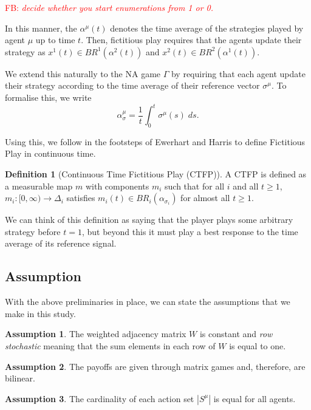 \documentclass{article}
\theoremstyle{definition}
\newtheorem*{definition}{Definition}
\newtheorem{assumption}{Assumption}
\newcommand{\fb}[1]{\textcolor{red}{FB: \textit{#1}}}
\newcommand{\weightset}{W}
\newcommand{\actionset}[1]{S^{#1}}
\newcommand{\refmu}{\sigma^{\mu}}
\newcommand{\avgref}[1]{\alpha_\sigma^{#1}}
\begin{document}
        \fb{decide whether you start enumerations from 1 or 0.}


	In this manner, the $\alpha^\mu(t)$ denotes the time average of the strategies played by agent
	$\mu$ up to time $t$. Then, fictitious play requires that the agents update their strategy as
	$x^1(t) \in BR^1(\alpha^2(t))$ and $x^2(t) \in
	BR^2(\alpha^1(t))$. 

	We extend this naturally to the NA game $\Gamma$ by requiring that each agent update their
	strategy according to the time average of their reference vector $\refmu$. To formalise this, we
	write
	\begin{equation}
		\avgref{\mu} = \frac{1}{t} \int_0^t \refmu(s) \; ds.
	\end{equation}

	Using this, we follow in the footsteps of Ewerhart \cite{} and Harris \cite{} to define
	Fictitious Play in continuous time.
%
	\begin{definition}[Continuous Time Fictitious Play (CTFP)]
		A CTFP is defined as a measurable map $m$ with components $m_i$ such that for all $i$ and
		all $t \geq 1$, $m_i: [0, \infty) \rightarrow \Delta_i$ satisfies $m_i(t) \in
		BR_i(\alpha_{\sigma_i})$ for almost all $t \geq 1$.
	\end{definition}

		We can think of this definition as saying that the player plays some arbitrary strategy before $t = 1$, but beyond this it must play a best response to the time average of its reference signal.

	\subsection{Assumption}

	With the above preliminaries in place, we can state the assumptions that we make in this study.

	\begin{assumption}
		The weighted adjacency matrix $\weightset$ is constant and \emph{row stochastic} meaning
		that the sum elements in each row of $\weightset$ is equal to one.
	\end{assumption}

	\begin{assumption}
		The payoffs are given through matrix games and, therefore, are bilinear.
	\end{assumption}

	\begin{assumption}
		The cardinality of each action set $|\actionset{\mu}|$ is equal for all agents.
	\end{assumption}
\end{document}
